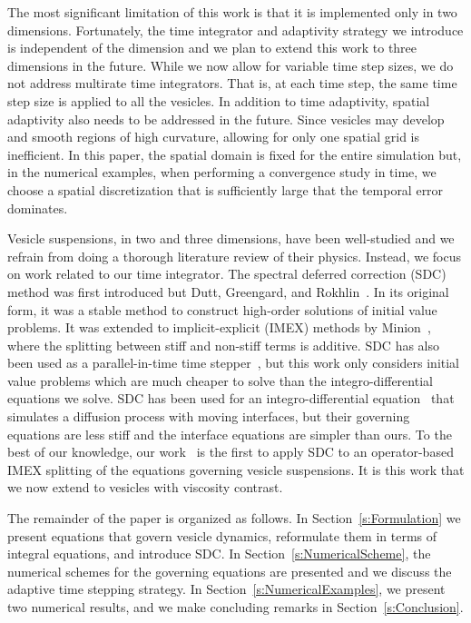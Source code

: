 \documentclass[3p,times,procedia]{elsarticle}
\begin{document}
The most significant limitation of this work is that it is implemented
only in two dimensions. 
Fortunately, the time integrator and adaptivity strategy we introduce is
independent of the dimension and we plan to extend this work to
three dimensions in the future.  While we now allow for variable time
step sizes, we do not address multirate time integrators.  That is, at
each time step, the same time step size is applied to all the vesicles.
In addition to time adaptivity, spatial adaptivity also needs to be
addressed in the future.  Since vesicles may develop and smooth regions
of high curvature, allowing for only one spatial grid is inefficient.
In this paper, the spatial domain is fixed for the entire simulation
but, in the numerical examples, when performing a convergence study in
time, we choose a spatial discretization that is sufficiently large that
the temporal error dominates.

Vesicle suspensions, in two and three dimensions, have been well-studied
and we refrain from doing a thorough literature review of their physics.
Instead, we focus on work related to our time integrator.  The spectral
deferred correction (SDC) method was first introduced but Dutt,
Greengard, and Rokhlin~\cite{dut:gre:rok2000}.  In its original form, it
was a stable method to construct high-order solutions of initial value
problems.  It was extended to implicit-explicit (IMEX) methods by
Minion~\cite{min2003}, where the splitting between stiff and non-stiff
terms is additive.  SDC has also been used as a parallel-in-time time
stepper~\cite{chr:mac:ong:spi2014}, but this work only considers initial
value problems which are much cheaper to solve than the
integro-differential equations we solve.  SDC has been used for an
integro-differential equation~\cite{hua:lai:xia2006} that simulates a
diffusion process with moving interfaces, but their governing equations
are less stiff and the interface equations are simpler than ours.  To
the best of our knowledge, our work~\cite{qua:bir2014c} is the first to
apply SDC to an operator-based IMEX splitting of the equations governing
vesicle suspensions.  It is this work that we now extend to vesicles
with viscosity contrast.

The remainder of the paper is organized as follows.  In
Section~\ref{s:Formulation} we present equations that govern vesicle
dynamics, reformulate them in terms of integral equations, and introduce
SDC.  In Section~\ref{s:NumericalScheme}, the numerical schemes for the
governing equations are presented and we discuss the adaptive time
stepping strategy.  In Section~\ref{s:NumericalExamples}, we present two
numerical results, and we make concluding remarks in
Section~\ref{s:Conclusion}.
\end{document}
